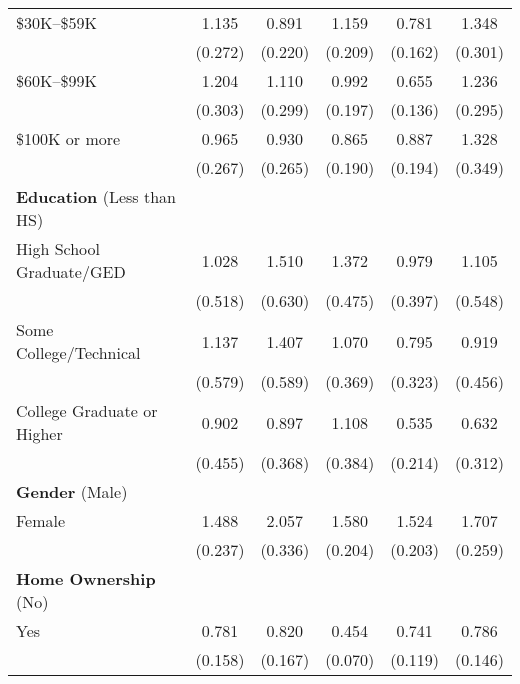 \begin{table}[htbp]
\begin{tabular}{l*{5}{c}}
\$30K--\$59K        &       1.135         &       0.891         &       1.159         &       0.781         &       1.348         \\
                    &     (0.272)         &     (0.220)         &     (0.209)         &     (0.162)         &     (0.301)         \\
\$60K--\$99K        &       1.204         &       1.110         &       0.992         &       0.655\sym{**} &       1.236         \\
                    &     (0.303)         &     (0.299)         &     (0.197)         &     (0.136)         &     (0.295)         \\
\$100K or more      &       0.965         &       0.930         &       0.865         &       0.887         &       1.328         \\
                    &     (0.267)         &     (0.265)         &     (0.190)         &     (0.194)         &     (0.349)         \\
\textbf{Education} (Less than HS) &  &  &  &   & \\
High School Graduate/GED&       1.028         &       1.510         &       1.372         &       0.979         &       1.105         \\
                    &     (0.518)         &     (0.630)         &     (0.475)         &     (0.397)         &     (0.548)         \\
Some College/Technical&       1.137         &       1.407         &       1.070         &       0.795         &       0.919         \\
                    &     (0.579)         &     (0.589)         &     (0.369)         &     (0.323)         &     (0.456)         \\
College Graduate or Higher&       0.902         &       0.897         &       1.108         &       0.535         &       0.632         \\
                    &     (0.455)         &     (0.368)         &     (0.384)         &     (0.214)         &     (0.312)         \\
\textbf{Gender} (Male) &  &  &  &   & \\
Female              &       1.488\sym{**} &       2.057\sym{***}&       1.580\sym{***}&       1.524\sym{***}&       1.707\sym{***}\\
                    &     (0.237)         &     (0.336)         &     (0.204)         &     (0.203)         &     (0.259)         \\
\textbf{Home Ownership} (No) &  &  &  &   & \\
Yes                 &       0.781         &       0.820         &       0.454\sym{***}&       0.741\sym{*}  &       0.786         \\
                    &     (0.158)         &     (0.167)         &     (0.070)         &     (0.119)         &     (0.146)         \\


\end{tabular}
\end{table}

